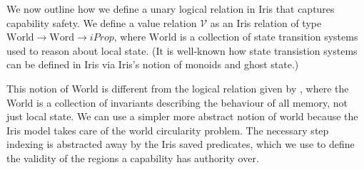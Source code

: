 \documentclass[sigplan,review]{acmart}\settopmatter{printfolios=true,printccs=false,printacmref=false}
\newcommand{\bigsep}{\mathop{\scalebox{2.5}{\raisebox{-0.4ex}{$*$}}}}%
\newcommand{\interp}[2]{(#1)(#2)}
\begin{document}
	



\newcommand{\World}{\mathrm{World}} \newcommand{\Word}{\mathrm{Word}} We now outline how we define a unary logical relation in Iris that captures capability safety.
We define a value relation $\mathcal{V}$ as an Iris relation of type $\World \to \Word \to iProp$, where $\World$ is a collection of state transition systems used to reason about local state.
(It is well-known how state transistion systems can be defined in Iris via Iris's notion of monoids and ghost state.)

This notion of World is different from the logical relation given by \cite{skorstengaardESOP18}, where the World is a collection of invariants describing the behaviour of all memory, not just local state.
We can use a simpler more abstract notion of world because the Iris model takes care of the world circularity problem. The necessary step indexing is abstracted away by the Iris saved predicates, which we use to define the validity of the regions a capability has authority over. 
\end{document}
